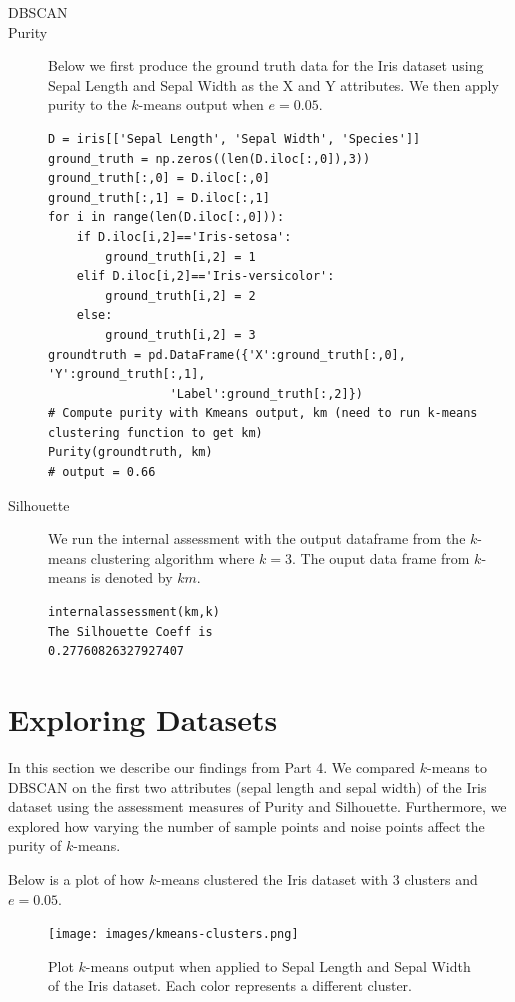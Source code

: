 \documentclass[psamsfonts,onesided,10pt]{amsart}
\begin{document}
\begin{description}
\item[DBSCAN] \todo{}
\item[Purity] Below we first produce the ground truth data for the Iris dataset using Sepal Length 
and Sepal Width as the X and Y attributes. We then apply purity to the $k$-means output when $e=0.05$. 
\begin{verbatim}
D = iris[['Sepal Length', 'Sepal Width', 'Species']]
ground_truth = np.zeros((len(D.iloc[:,0]),3))
ground_truth[:,0] = D.iloc[:,0]
ground_truth[:,1] = D.iloc[:,1]
for i in range(len(D.iloc[:,0])):
    if D.iloc[i,2]=='Iris-setosa':
        ground_truth[i,2] = 1
    elif D.iloc[i,2]=='Iris-versicolor':
        ground_truth[i,2] = 2
    else:
        ground_truth[i,2] = 3
groundtruth = pd.DataFrame({'X':ground_truth[:,0], 'Y':ground_truth[:,1], 
                 'Label':ground_truth[:,2]})       
# Compute purity with Kmeans output, km (need to run k-means clustering function to get km)
Purity(groundtruth, km)
# output = 0.66
\end{verbatim}
\item[Silhouette] We run the internal assessment with the output dataframe from the 
$k$-means clustering algorithm where $k=3$. The ouput data frame from $k$-means is denoted by $km$.
\begin{verbatim}
internalassessment(km,k)
The Silhouette Coeff is 
0.27760826327927407
\end{verbatim}
\end{description}

\section{Exploring Datasets}
In this section we describe our findings from Part 4. We compared $k$-means to DBSCAN on the 
first two attributes (sepal length and sepal width) of the Iris dataset using the assessment 
measures of Purity and Silhouette. Furthermore, we explored 
how varying the number of sample points and noise points affect the purity of $k$-means. 

Below is a plot of how $k$-means clustered the Iris dataset with 3 clusters and $e=0.05$.
\begin{figure}[H]
    \centering
    {\texttt{[image: images/kmeans-clusters.png]}} \\
    \caption{Plot $k$-means output when applied to Sepal Length and Sepal Width of the Iris dataset. Each color represents a different cluster.}
\end{figure}
\end{document}
